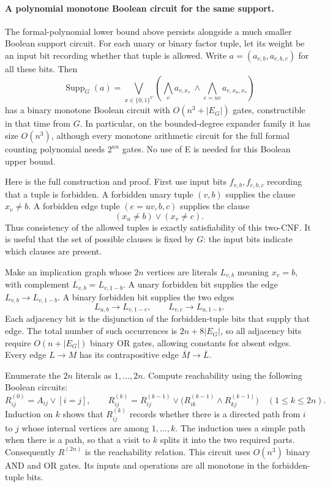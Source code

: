 \paragraph{A polynomial monotone Boolean circuit for the same support.}
The formal-polynomial lower bound above persists alongside a much smaller
Boolean support circuit.  For each unary or binary factor tuple, let its
weight be an input bit recording whether that tuple is allowed.  Write
$a=(a_{v,b},a_{e,b,c})$ for all these bits.  Then
\[
 \operatorname{Supp}_G(a)=
 \bigvee_{x\in\{0,1\}^V}
       \left(\bigwedge_v a_{v,x_v}\ \wedge\!
                         \bigwedge_{e=uv}a_{e,x_u,x_v}\right)
\]
has a binary monotone Boolean circuit with $O(n^3+|E_G|)$ gates,
constructible in that time from $G$.  In particular, on the bounded-degree
expander family it has size $O(n^3)$, although every monotone arithmetic
circuit for the full formal counting polynomial needs $2^{\kappa n}$
gates.  No use of E is needed for this Boolean upper bound.

Here is the full construction and proof.  First use input bits
$f_{v,b},f_{e,b,c}$ recording that a tuple is forbidden.  A forbidden
unary tuple $(v,b)$ supplies the clause $x_v\ne b$.  A forbidden edge
tuple $(e=uv,b,c)$ supplies the clause
\[
                       (x_u\ne b)\vee(x_v\ne c).
\]
Thus consistency of the allowed tuples is exactly satisfiability of
this two-CNF.  It is useful that the set of possible clauses is fixed
by $G$: the input bits indicate which clauses are present.

Make an implication graph whose $2n$ vertices are literals
$L_{v,b}$ meaning $x_v=b$, with complement
$\overline{L_{v,b}}=L_{v,1-b}$.  A unary forbidden bit supplies
the edge $L_{v,b}\to L_{v,1-b}$.  A binary forbidden bit supplies
the two edges
\[
 L_{u,b}\longrightarrow L_{v,1-c},\qquad
 L_{v,c}\longrightarrow L_{u,1-b}.
\]
Each adjacency bit is the disjunction of the forbidden-tuple bits
that supply that edge.  The total number of such occurrences is
$2n+8|E_G|$, so all adjacency bits require $O(n+|E_G|)$ binary
OR gates, allowing constants for absent edges.  Every edge
$L\to M$ has its contrapositive edge
$\overline M\to\overline L$.

Enumerate the $2n$ literals as $1,\ldots,2n$.  Compute reachability
using the following Boolean circuits:
\[
 R^{(0)}_{ij}=A_{ij}\vee[i=j],\qquad
 R^{(k)}_{ij}=R^{(k-1)}_{ij}\vee
             \bigl(R^{(k-1)}_{ik}\wedge R^{(k-1)}_{kj}\bigr)
                     \quad(1\le k\le2n).
\]
Induction on $k$ shows that $R^{(k)}_{ij}$ records whether there is
a directed path from $i$ to $j$ whose internal vertices are among
$1,\ldots,k$.  The induction uses a simple path when there is a
path, so that a visit to $k$ splits it into the two required parts.
Consequently $R^{(2n)}$ is the reachability relation.  This circuit
uses $O(n^3)$ binary AND and OR gates.  Its inputs and operations
are all monotone in the forbidden-tuple bits.

